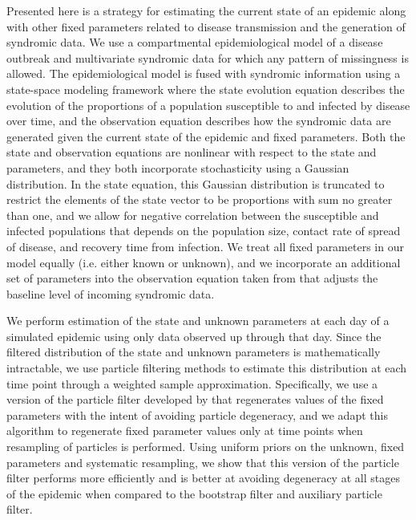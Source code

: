 
Presented here is a strategy for estimating the current state of an epidemic along with other fixed parameters related to disease transmission and the generation of syndromic data. We use a compartmental epidemiological model of a disease outbreak and multivariate syndromic data for which any pattern of missingness is allowed. The epidemiological model is fused with syndromic information using a state-space modeling framework where the state evolution equation describes the evolution of the proportions of a population susceptible to and infected by disease over time, and the observation equation describes how the syndromic data are generated given the current state of the epidemic and fixed parameters. Both the state and observation equations are nonlinear with respect to the state and parameters, and they both incorporate stochasticity using a Gaussian distribution. In the state equation, this Gaussian distribution is truncated to restrict the elements of the state vector to be proportions with sum no greater than one, and we allow for negative correlation between the susceptible and infected populations that depends on the population size, contact rate of spread of disease, and recovery time from infection. We treat all fixed parameters in our model equally (i.e. either known or unknown), and we incorporate an additional set of parameters into the observation equation taken from \citet{skvortsov2012monitoring} that adjusts the baseline level of incoming syndromic data.

We perform estimation of the state and unknown parameters at each day of a simulated epidemic using only data observed up through that day. Since the filtered distribution of the state and unknown parameters is mathematically intractable, we use particle filtering methods to estimate this distribution at each time point through a weighted sample approximation. Specifically, we use a version of the particle filter developed by \citet{Liu:West:comb:2001} that regenerates values of the fixed parameters with the intent of avoiding particle degeneracy, and we adapt this algorithm to regenerate fixed parameter values only at time points when resampling of particles is performed. Using uniform priors on the unknown, fixed parameters and systematic resampling, we show that this version of the particle filter performs more efficiently and is better at avoiding degeneracy at all stages of the epidemic when compared to the bootstrap filter and auxiliary particle filter.

